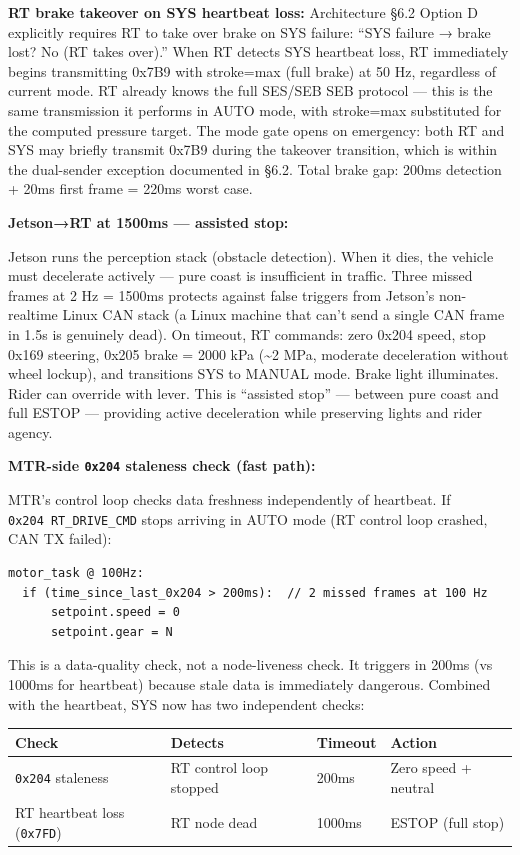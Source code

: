 \documentclass[12pt,a4paper,oneside]{report}
\begin{document}
\textbf{RT brake takeover on SYS heartbeat loss:} Architecture §6.2 Option D
explicitly requires RT to take over brake on SYS failure: ``SYS failure → brake
lost? No (RT takes over).'' When RT detects SYS heartbeat loss, RT immediately
begins transmitting 0x7B9 with stroke=max (full brake) at 50 Hz, regardless of
current mode. RT already knows the full SES/SEB SEB protocol --- this is the
same transmission it performs in AUTO mode, with stroke=max substituted for the
computed pressure target. The mode gate opens on emergency: both RT and SYS may
briefly transmit 0x7B9 during the takeover transition, which is within the
dual-sender exception documented in §6.2. Total brake gap: 200ms detection +
20ms first frame = 220ms worst case.

\textbf{Jetson→RT at 1500ms --- assisted stop:}

Jetson runs the perception stack (obstacle detection). When it dies, the vehicle
must decelerate actively --- pure coast is insufficient in traffic. Three missed
frames at 2 Hz = 1500ms protects against false triggers from Jetson's
non-realtime Linux CAN stack (a Linux machine that can't send a single CAN frame
in 1.5s is genuinely dead). On timeout, RT commands: zero 0x204 speed, stop
0x169 steering, 0x205 brake = 2000 kPa (\textasciitilde2 MPa, moderate
deceleration without wheel lockup), and transitions SYS to MANUAL mode. Brake
light illuminates. Rider can override with lever. This is ``assisted stop'' ---
between pure coast and full ESTOP --- providing active deceleration while
preserving lights and rider agency.

\textbf{MTR-side \texttt{0x204} staleness check (fast path):}

MTR's control loop checks data freshness independently of heartbeat. If
\texttt{0x204\ RT\_DRIVE\_CMD} stops arriving in AUTO mode (RT control loop
crashed, CAN TX failed):

\begin{verbatim}
motor_task @ 100Hz:
  if (time_since_last_0x204 > 200ms):  // 2 missed frames at 100 Hz
      setpoint.speed = 0
      setpoint.gear = N
\end{verbatim}

This is a data-quality check, not a node-liveness check. It triggers in 200ms
(vs 1000ms for heartbeat) because stale data is immediately dangerous. Combined
with the heartbeat, SYS now has two independent checks:

\begin{longtable}[]{@{}llll@{}}
\toprule\noalign{}
Check & Detects & Timeout & Action \\
\midrule\noalign{}
\endhead
\bottomrule\noalign{}
\endlastfoot
\texttt{0x204} staleness & RT control loop stopped & 200ms & Zero speed +
neutral \\
RT heartbeat loss (\texttt{0x7FD}) & RT node dead & 1000ms & ESTOP (full
stop) \\
\end{longtable}
\end{document}
